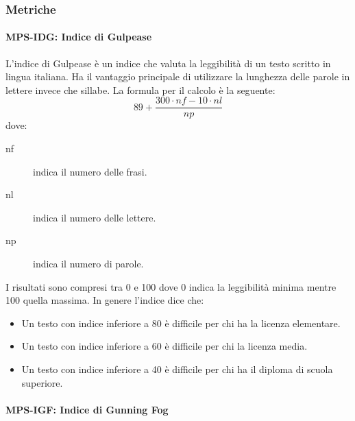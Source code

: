 \documentclass[../norme-di-progetto.tex]{subfiles}
\begin{document}
\subsubsection{Metriche}%
\label{subs:documentazione/metriche}

\paragraph{MPS-IDG\@: Indice di Gulpease}%
\label{par:MPS-IDG_indice_di_Gulpease}

L'indice di Gulpease è un indice che valuta la leggibilità di un testo scritto in lingua italiana. Ha il vantaggio principale di utilizzare la lunghezza delle parole in lettere invece che sillabe. La formula per il calcolo è la seguente:
\[
  89 +\frac{300\cdot nf-10\cdot nl}{np}
\]
dove:
\begin{description}
  \item [nf] indica il numero delle frasi.
  \item [nl] indica il numero delle lettere.
  \item [np] indica il numero di parole.
\end{description}
I risultati sono compresi tra 0 e 100 dove 0 indica la leggibilità minima mentre 100 quella massima. In genere l'indice dice che:
\begin{itemize}
  \item Un testo con indice inferiore a 80 è difficile per chi ha la licenza elementare.
  \item Un testo con indice inferiore a 60 è difficile per chi la licenza media.
  \item Un testo con indice inferiore a 40 è difficile per chi ha il diploma di scuola superiore.
\end{itemize}
\paragraph{MPS-IGF\@: Indice di Gunning Fog}%
\label{par:MPS-IGF_indice_di_Gunning_Fog}
\end{document}
